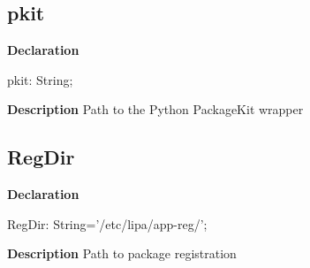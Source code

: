 \documentclass{report}
\newif\ifpdf
\begin{document}
\subsection*{pkit}
\fi
\label{ipkhandle-pkit}
\begin{list}{}{
\setlength{\itemindent}{0cm}
\setlength{\listparindent}{0cm}
\setlength{\leftmargin}{\evensidemargin}
\addtolength{\leftmargin}{\tmplength}
\settowidth{\labelsep}{X}
\addtolength{\leftmargin}{\labelsep}
\setlength{\labelwidth}{\tmplength}
}
\item[\textbf{Declaration}\hfill]
\ifpdf
\begin{flushleft}
\fi
\begin{ttfamily}
pkit: String;\end{ttfamily}

\ifpdf
\end{flushleft}
\fi

\par
\item[\textbf{Description}]
Path to the Python PackageKit wrapper

\end{list}
\ifpdf
\subsection*{\large{\textbf{RegDir}}\normalsize\hspace{1ex}\hrulefill}
\else
\subsection*{RegDir}
\fi
\label{ipkhandle-RegDir}
\begin{list}{}{
\setlength{\itemindent}{0cm}
\setlength{\listparindent}{0cm}
\setlength{\leftmargin}{\evensidemargin}
\addtolength{\leftmargin}{\tmplength}
\settowidth{\labelsep}{X}
\addtolength{\leftmargin}{\labelsep}
\setlength{\labelwidth}{\tmplength}
}
\item[\textbf{Declaration}\hfill]
\ifpdf
\begin{flushleft}
\fi
\begin{ttfamily}
RegDir: String='/etc/lipa/app-reg/';\end{ttfamily}

\ifpdf
\end{flushleft}
\fi

\par
\item[\textbf{Description}]
Path to package registration

\end{list}
\end{document}
